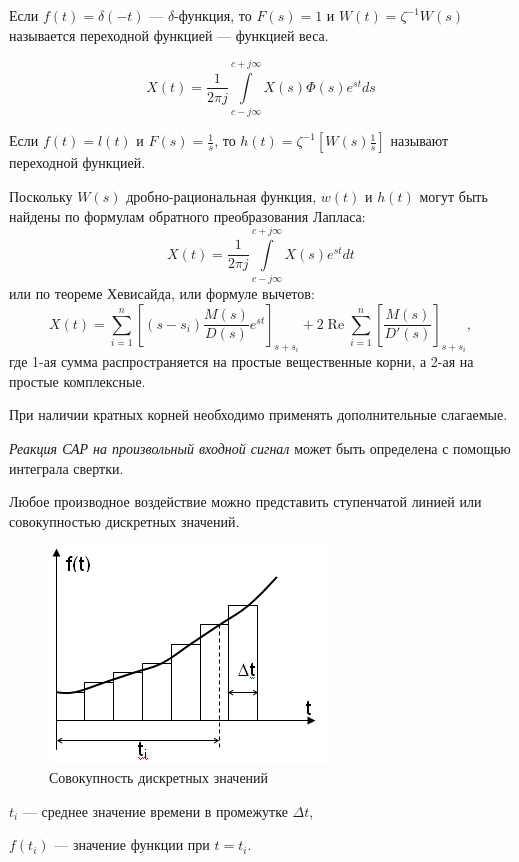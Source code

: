 \documentclass[unicode, 12pt, a4paper, oneside]{article}
\begin{document}
Если $ f(t) = \delta(-t) $ --- $ \delta $-функция, то $ F(s) = 1 $ и $ W(t) = \zeta^{-1}W(s) $ называется переходной функцией --- функцией веса.

\begin{equation}
X(t) = \dfrac{1}{2\pi j} \int\limits_{c - j\infty}^{c + j\infty} X(s) \Phi(s) e^{st} ds
\end{equation}

Если $ f(t) = l(t) $ и $ F(s) = \frac{1}{s} $, то $ h(t) = \zeta^{-1}[W(s)\frac{1}{s}] $ называют переходной функцией.

Поскольку $ W(s) $ дробно-рациональная функция, $ w(t) $  и  $ h(t) $ могут быть найдены по формулам обратного преобразования Лапласа:
\begin{equation}
X(t) = \dfrac{1}{2\pi j} \int\limits_{c - j\infty}^{c + j\infty} X(s) e^{st} dt
\end{equation}
или по теореме Хевисайда, или формуле вычетов:
\begin{equation}
X(t) = \sum_{i=1}^{n} \left[ (s - s_i)\dfrac{M(s)}{D(s)} e^{st} \right]_{s + s_i} + 2\operatorname{Re} \sum_{i=1}^{n} \left[ \dfrac{M(s)}{D'(s)} \right]_{s + s_i},
\end{equation}
где 1-ая сумма распространяется на простые вещественные корни, а 2-ая на простые комплексные.

При наличии кратных корней необходимо применять дополнительные слагаемые.

\textit{Реакция САР на произвольный входной сигнал} может быть определена с помощью интеграла свертки.

Любое производное воздействие можно представить ступенчатой линией или совокупностью дискретных значений.

\begin{figure}[H]
\centering
\includegraphics[width=0.45\linewidth]{24_graph.png}
\caption{Совокупность дискретных значений}
\end{figure}

\par $ t_i $  --- среднее значение времени в промежутке $ \Delta t $,\nopagebreak
\par $ f(t_i) $ --- значение функции при $ t = t_i $.
\end{document}
